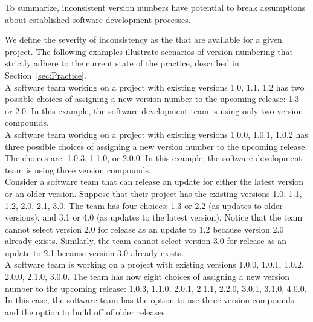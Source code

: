 \documentclass[conference]{IEEEtran}
\begin{document}
To summarize, inconsistent version numbers have potential to break assumptions about established software development processes.

We define the severity of inconsistency as the \numberchoices that are available for a 
given project. The following examples illustrate scenarios of version numbering that strictly adhere to the current state of the practice, described in 
Section~\ref{sec:Practice}.\\


 A software team working on a project with existing versions 1.0, 1.1, 1.2 has two possible choices of assigning a new version number to the upcoming release: 1.3 or 2.0. 
In this example, the software development team is using only two version compounds. \\

 A software team working on a project with existing versions 1.0.0, 1.0.1, 1.0.2 has three possible choices of assigning a new version number to the upcoming release. The choices are: 1.0.3, 1.1.0, or 2.0.0. 
In this example, the software development team is using three version compounds. \\


Consider a software team that can release an update for either the latest version or an older version. Suppose that their project has the existing versions 1.0, 1.1, 1.2, 2.0, 2.1, 3.0. The team has four choices: 1.3 or 2.2 (as updates to older versions), and 3.1 or 4.0 (as updates to the latest version). 
Notice that the team cannot select version 2.0 for release as an update to 1.2 
because version 2.0 already exists. 
Similarly, the team cannot select version 3.0 for release as an update to 2.1 because version 3.0 already exists. \\

  A software team  is working on a project with existing versions 1.0.0, 1.0.1, 1.0.2, 2.0.0, 2.1.0, 3.0.0. 
The team has now eight choices of assigning a new version number to the upcoming release: 
1.0.3, 1.1.0, 2.0.1, 2.1.1, 2.2.0, 3.0.1, 3.1.0, 4.0.0. 
In this case, the software team has the option to use three version compounds and the option to build off of older releases. \\
\end{document}
